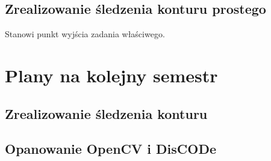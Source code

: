 \documentclass[12pt, a4paper, twoside]{book}
\begin{document}
	\section{Zrealizowanie śledzenia konturu prostego}
		Stanowi punkt wyjścia zadania właściwego.
			
\chapter{Plany na kolejny semestr}
	\section{Zrealizowanie śledzenia konturu}
	\section{Opanowanie OpenCV i DisCODe}
\end{document}
